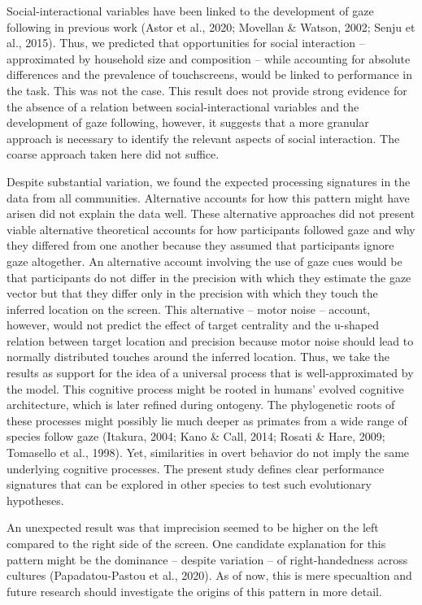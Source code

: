 \documentclass[
  man,floatsintext]{apa7}
\begin{document}
Social-interactional variables have been linked to the development of gaze following in previous work (Astor et al., 2020; Movellan \& Watson, 2002; Senju et al., 2015). Thus, we predicted that opportunities for social interaction -- approximated by household size and composition -- while accounting for absolute differences and the prevalence of touchscreens, would be linked to performance in the task. This was not the case. This result does not provide strong evidence for the absence of a relation between social-interactional variables and the development of gaze following, however, it suggests that a more granular approach is necessary to identify the relevant aspects of social interaction. The coarse approach taken here did not suffice.

Despite substantial variation, we found the expected processing signatures in the data from all communities. Alternative accounts for how this pattern might have arisen did not explain the data well. These alternative approaches did not present viable alternative theoretical accounts for how participants followed gaze and why they differed from one another because they assumed that participants ignore gaze altogether. An alternative account involving the use of gaze cues would be that participants do not differ in the precision with which they estimate the gaze vector but that they differ only in the precision with which they touch the inferred location on the screen. This alternative -- motor noise -- account, however, would not predict the effect of target centrality and the u-shaped relation between target location and precision because motor noise should lead to normally distributed touches around the inferred location. Thus, we take the results as support for the idea of a universal process that is well-approximated by the model. This cognitive process might be rooted in humans' evolved cognitive architecture, which is later refined during ontogeny. The phylogenetic roots of these processes might possibly lie much deeper as primates from a wide range of species follow gaze (Itakura, 2004; Kano \& Call, 2014; Rosati \& Hare, 2009; Tomasello et al., 1998). Yet, similarities in overt behavior do not imply the same underlying cognitive processes. The present study defines clear performance signatures that can be explored in other species to test such evolutionary hypotheses.

An unexpected result was that imprecision seemed to be higher on the left compared to the right side of the screen. One candidate explanation for this pattern might be the dominance -- despite variation -- of right-handedness across cultures (Papadatou-Pastou et al., 2020). As of now, this is mere specualtion and future research should investigate the origins of this pattern in more detail.
\end{document}
